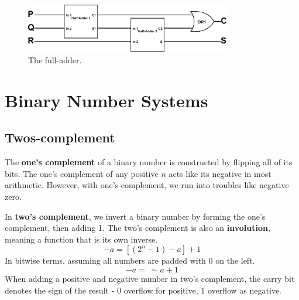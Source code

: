 \documentclass[11pt]{article}
\begin{document}
			\begin{figure}[htb]
				\centering
				\includegraphics[width=0.8\textwidth]{full-adder.png}
				\caption{The full-adder.}
				\label{fig:full-adder}
			\end{figure}
			
\section{Binary Number Systems}
	\subsection{Twos-complement}
		The \textbf{one's complement} of a binary number is constructed by flipping all of its bits. The one's complement of any positive $n$ acts like its negative in most arithmetic. However, with one's complement, we run into troubles like negative zero.
		
		In \textbf{two's complement}, we invert a binary number by forming the one's complement, then adding 1. The two's complement is also an \textbf{involution}, meaning a function that is its own inverse.
		\begin{equation}
			-a = [(2^n - 1) - a] + 1
		\end{equation}
		In bitwise terms, assuming all numbers are padded with 0 on the left.
		\begin{equation}
			-a =\ \sim a + 1
		\end{equation}
		When adding a positive and negative number in two's complement, the carry bit denotes the sign of the result - 0 overflow for positive, 1 overflow as negative.
%		
%		


\end{document}
